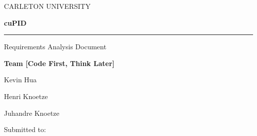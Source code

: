 \documentclass[english]{article}
\begin{document}
\thispagestyle{empty}

\begin{center}
CARLETON UNIVERSITY
\par\end{center}

\vspace{4cm}


\begin{center}
\textbf{{\fontsize{50pt}{50pt}\selectfont cuPID}}
\par\end{center}

\textcolor{black}{\rule[0.5ex]{0.95\columnwidth}{0.5pt}}

\begin{center}
{\LARGE{}Requirements Analysis Document}
\par\end{center}{\LARGE \par}

\vspace{5cm}


\begin{center}
\textbf{\Large{}Team {[}Code First, Think Later{]}}
\par\end{center}{\Large \par}

\begin{center}
{\large{}Kevin Hua}
\par\end{center}{\large \par}

\begin{center}
{\large{}Henri Knoetze}
\par\end{center}{\large \par}

\begin{center}
{\large{}Juhandre Knoetze}
\par\end{center}{\large \par}

{\large{}\vspace{2cm}
}{\large \par}

\begin{center}
{\large{}Submitted to:}
\par\end{center}{\large \par}
\end{document}
